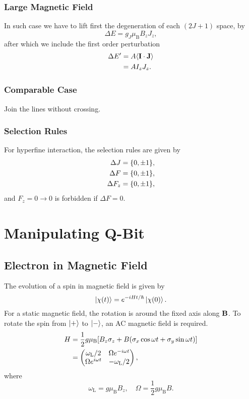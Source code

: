 \documentclass{article}
\begin{document}
\subsubsection{Large Magnetic Field}

In such case we have to lift first the degeneration of each $(2J+1)$ space, by
\[ \Delta E = g_J \mu_{\mathrm{B}} B_z J_z, \]
after which we include the first order perturbation
\begin{align*}
    \Delta E' &= A\langle \vb{I}\cdot \vb{J} \rangle \\ 
    &= A I_z J_z.
\end{align*}

\subsubsection{Comparable Case}

Join the lines without crossing.

\subsubsection{Selection Rules}

For hyperfine interaction, the selection rules are given by
\begin{align*}
    \Delta J &= \qty{0,\pm 1}, \\
    \Delta F &= \qty{0,\pm 1}, \\
    \Delta F_z &= \qty{0,\pm 1},
\end{align*}
and $F_z = 0\rightarrow 0$ is forbidden if $\Delta F = 0$.

\section{Manipulating Q-Bit}

\subsection{Electron in Magnetic Field}

The evolution of a spin in magnetic field is given by
\[ \ket{\chi(t)} = e^{-iHt/\hbar} \ket{\chi(0)}. \]
For a static magnetic field, the rotation is around the fixed axis along $\vb{B}$.
To rotate the spin from $\ket{+}$ to $\ket{-}$, an AC magnetic field is required.
\begin{align*}
    H &= \frac{1}{2}g\mu_{\mathrm{B}}\qty[ B_z \sigma_z + B(\sigma_x \cos\omega t + \sigma_y \sin\omega t) ] \\
    &= \begin{pmatrix}
        \omega_{\mathrm{L}}/2 & \Omega e^{-i\omega t} \\
        \Omega e^{i\omega t} & -\omega_{\mathrm{L}}/2
    \end{pmatrix},
\end{align*}
where
\[ \omega_{\mathrm{L}} = g \mu_{\mathrm{B}} B_z,\quad \Omega = \frac{1}{2} g \mu_{\mathrm{B}} B. \]

% 
% 
\end{document}
